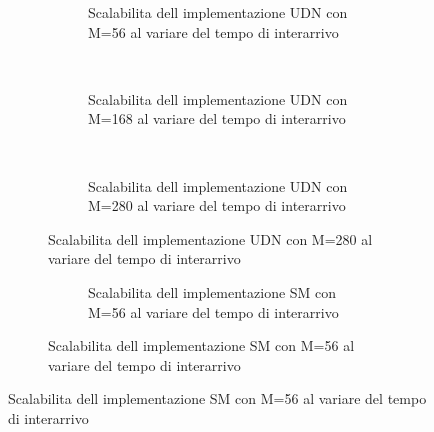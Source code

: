 \begin{figure}[p]
  \caption{Grafici di scalabilit\`a del tempo di completamento dello stream al variare del tempo di interarrivo}
  \begin{subfigure}[b]{.5\columnwidth}
    \centering
    \renewcommand\thesubfigure{\alph{subfigure}}
    \caption{Implementazione con solo UDN}
    \begin{subfigure}[b]{\textwidth}
      \centering
      \addtocounter{subfigure}{-1}
      \renewcommand\thesubfigure{\alph{subfigure}1}
      \resizebox{\columnwidth}{!}{}
      \caption{Scalabilita dell implementazione UDN con M=56 al variare del tempo di interarrivo}
      \label{fig:scalability_UDN_size56}
    \end{subfigure}
    ~
    \begin{subfigure}[b]{\textwidth}
      \centering
      \addtocounter{subfigure}{-1}
      \renewcommand\thesubfigure{\alph{subfigure}2}
      \resizebox{\columnwidth}{!}{}
      \caption{Scalabilita dell implementazione UDN con M=168 al variare del tempo di interarrivo}
      \label{fig:scalability_UDN_size168}
    \end{subfigure}
    ~
    \begin{subfigure}[b]{\textwidth}
      \centering
      \addtocounter{subfigure}{-1}
      \renewcommand\thesubfigure{\alph{subfigure}3}
      \resizebox{\columnwidth}{!}{}
      \caption{Scalabilita dell implementazione UDN con M=280 al variare del tempo di interarrivo}
      \label{fig:scalability_UDN_size280}
    \end{subfigure}
    \label{fig:allScalbility_UDN}
  \end{subfigure}
  \hspace{2ex}
  \begin{subfigure}[b]{.5\columnwidth}
    \centering
    \renewcommand\thesubfigure{\alph{subfigure}}
    \caption{Implementazione con solo SM}
    \begin{subfigure}[b]{\textwidth}
      \centering
      \addtocounter{subfigure}{-1}
      \renewcommand\thesubfigure{\alph{subfigure}1}
      \resizebox{\columnwidth}{!}{}
      \caption{Scalabilita dell implementazione SM con M=56 al variare del tempo di interarrivo}
      \label{fig:scalability_SM_size56}

\end{subfigure}
\end{subfigure}
\end{figure}
